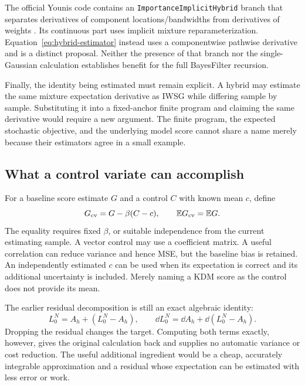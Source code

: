 The official Younis code contains an
\texttt{ImportanceImplicitHybrid} branch that separates derivatives of
component locations/bandwidths from derivatives of weights
\citep{youniscode2023}. Its continuous part uses implicit mixture
reparameterization. Equation~\eqref{eq:hybrid-estimator} instead uses a
componentwise pathwise derivative and is a distinct proposal. Neither the
presence of that branch nor the single-Gaussian calculation establishes
benefit for the full BayesFilter recursion.

Finally, the identity being estimated must remain explicit. A hybrid may
estimate the same mixture expectation derivative as IWSG while differing
sample by sample. Substituting it into a fixed-anchor finite program and
claiming the same derivative would require a new argument. The finite
program, the expected stochastic objective, and the underlying model score
cannot share a name merely because their estimators agree in a small example.

\subsection{What a control variate can accomplish}

For a baseline score estimate $G$ and a control $C$ with known mean $c$, define
\begin{equation}
 G_{\rm cv}=G-\beta(C-c),\qquad
 \mathbb E G_{\rm cv}=\mathbb E G.
 \label{eq:score-control-variate}
\end{equation}
The equality requires fixed $\beta$, or suitable independence from the
current estimating sample. A vector control may use a coefficient matrix.
A useful correlation can reduce variance and hence MSE, but the baseline
bias is retained. An independently estimated $c$ can be used when its
expectation is correct and its additional uncertainty is included. Merely
naming a KDM score as the control does not provide its mean.

The earlier residual decomposition is still an exact algebraic identity:
\begin{equation}
 L_0^N=A_h+\left(L_0^N-A_h\right),\qquad
 \dd L_0^N=\dd A_h+\dd\left(L_0^N-A_h\right).
 \label{eq:residual}
\end{equation}
Dropping the residual changes the target. Computing both terms exactly,
however, gives the original calculation back and supplies no automatic
variance or cost reduction. The useful additional ingredient would be a
cheap, accurately integrable approximation and a residual whose expectation
can be estimated with less error or work.

